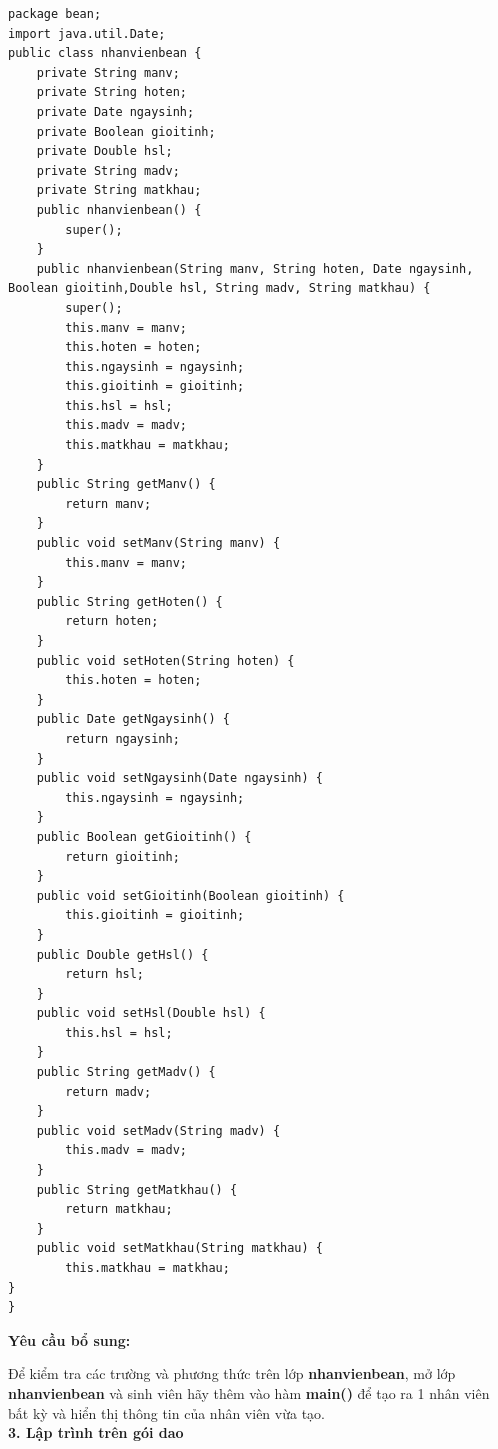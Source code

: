 \begin{lstlisting}[escapechar=`]
package bean;
import java.util.Date;
public class nhanvienbean {
	private String manv;
	private String hoten;
	private Date ngaysinh;
	private Boolean gioitinh;
	private Double hsl;
	private String madv;
	private String matkhau;
	public nhanvienbean() {
		super();
	}
	public nhanvienbean(String manv, String hoten, Date ngaysinh, Boolean gioitinh,Double hsl, String madv, String matkhau) {
		super();
		this.manv = manv;
		this.hoten = hoten;
		this.ngaysinh = ngaysinh;
		this.gioitinh = gioitinh;
		this.hsl = hsl;
		this.madv = madv;
		this.matkhau = matkhau;
	}
	public String getManv() {
		return manv;
	}
	public void setManv(String manv) {
		this.manv = manv;
	}
	public String getHoten() {
		return hoten;
	}
	public void setHoten(String hoten) {
		this.hoten = hoten;
	}
	public Date getNgaysinh() {
		return ngaysinh;
	}
	public void setNgaysinh(Date ngaysinh) {
		this.ngaysinh = ngaysinh;
	}
	public Boolean getGioitinh() {
		return gioitinh;
	}
	public void setGioitinh(Boolean gioitinh) {
		this.gioitinh = gioitinh;
	}
	public Double getHsl() {
		return hsl;
	}
	public void setHsl(Double hsl) {
		this.hsl = hsl;
	}
	public String getMadv() {
		return madv;
	}
	public void setMadv(String madv) {
		this.madv = madv;
	}
	public String getMatkhau() {
		return matkhau;
	}
	public void setMatkhau(String matkhau) {
		this.matkhau = matkhau;
}
}
\end{lstlisting}

\textbf{Yêu cầu bổ sung:}

Để kiểm tra các trường và phương thức trên lớp \textbf{nhanvienbean}, mở lớp \textbf{nhanvienbean} và sinh viên hãy thêm vào hàm \textbf{main()} để tạo ra 1 nhân viên bất kỳ và hiển thị thông tin của nhân viên vừa tạo.\\
\textbf{3. Lập trình trên gói dao}


